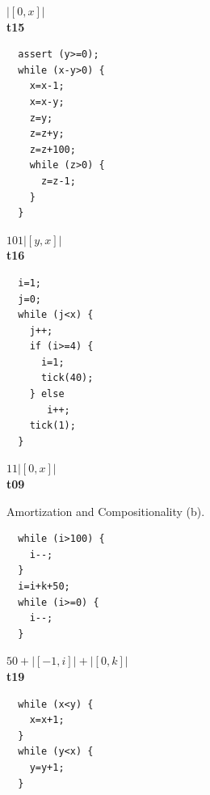 \documentclass{sigplanconf}
\begin{document}
{\begin{figure}
\begin{minipage}[b]{\progwidth}
\begin{center}
$|[0,x]|$
\\[.7\baselineskip]
      {\bf t15}
    \end{center}
  \end{minipage}
%
%
  \begin{minipage}[b]{\progwidth}
    \begin{center}
   \begin{lstlisting}
  assert (y>=0);
  while (x-y>0) {
    x=x-1;
    x=x-y;
    z=y;
    z=z+y;
    z=z+100;
    while (z>0) {
      z=z-1;
    }
  }
   \end{lstlisting}

$101|[y,x]|$
\\[.7\baselineskip]
      {\bf t16}
    \end{center}
  \end{minipage}
%
%
  \begin{minipage}[b]{\progwidth}
    \begin{center}
   \begin{lstlisting}
  i=1;
  j=0;
  while (j<x) {
    j++;
    if (i>=4) {
      i=1;
      tick(40);
    } else
       i++;
    tick(1);
  }
   \end{lstlisting}

$11|[0,x]|$
\\[.7\baselineskip]
      {\bf t09}
    \end{center}
  \end{minipage}


   \caption{Amortization and Compositionality (b).}
  \label{fig:cat1b}
\end{figure}


\begin{figure}
 \setlength{\progwidth}{.24\linewidth}
  \centering

  \begin{minipage}[b]{\progwidth}
    \begin{center}
   \begin{lstlisting}
  while (i>100) {
    i--;
  }
  i=i+k+50;
  while (i>=0) {
    i--;
  }
   \end{lstlisting}

$50 + |[-1,i]| + |[0,k]|$
\\[.7\baselineskip]
      {\bf t19}
    \end{center}
  \end{minipage}%
%
%
%
  \begin{minipage}[b]{\progwidth}
    \begin{center}
   \begin{lstlisting}
  while (x<y) {
    x=x+1;
  }
  while (y<x) {
    y=y+1;
  }
   \end{lstlisting}


\end{center}
\end{minipage}
\end{figure}}
\end{document}
